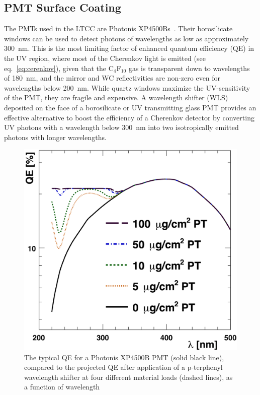 \subsection{PMT Surface Coating}

The PMTs used in the LTCC are Photonis XP4500Bs~\cite{Photonis:2007ta}. Their borosilicate windows can be used to
detect photons of wavelengths as low as approximately 300~nm. This is the most limiting factor of enhanced quantum efficiency
(QE) in the UV region, where most of the Cherenkov light is emitted (see eq.~\ref{eq:cerenkov}), given that the
C$_4$F$_{10}$ gas is transparent down to wavelengths of 180~nm, and the mirror and WC reflectivities are non-zero
even for wavelengths below 200~nm. While quartz windows maximize the UV-sensitivity of the PMT, they are fragile
and expensive. A wavelength shifter (WLS) deposited on the face of a borosilicate or UV transmitting glass PMT provides
an effective alternative to boost the efficiency of a Cherenkov detector by converting UV photons with a wavelength
below 300~nm into two isotropically emitted photons with longer wavelengths.


\begin{figure}[H]
	\centering
	\includegraphics[width=0.99\columnwidth, height=0.75\columnwidth]{img/pmtQuantumEfficiencyGain.png}
	\caption{The typical QE for a Photonis XP4500B PMT (solid black line), compared to the projected QE after
          application of a p-terphenyl wavelength shifter at four different material loads (dashed lines), as a function
          of wavelength}
	\label{fig:pmtQuantumEfficiencyGainAndExample}
\end{figure}


